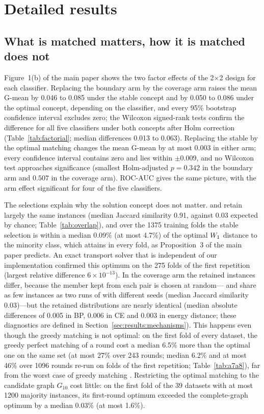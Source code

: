 \section{Detailed results}\label{sec:results}

\subsection{What is matched matters, how it is matched does not}\label{sec:results:factorial}

Figure~1(b) of the main paper shows the two factor effects of the 2$\times$2 design for each classifier. Replacing the boundary arm by the coverage arm raises the mean G-mean by 0.046 to 0.085 under the stable concept and by 0.050 to 0.086 under the optimal concept, depending on the classifier, and every 95\% bootstrap confidence interval excludes zero; the Wilcoxon signed-rank tests confirm the difference for all five classifiers under both concepts after Holm correction (Table~\ref{tab:factorial}; median differences 0.013 to 0.063). Replacing the stable by the optimal matching changes the mean G-mean by at most 0.003 in either arm; every confidence interval contains zero and lies within $\pm0.009$, and no Wilcoxon test approaches significance (smallest Holm-adjusted $p=0.342$ in the boundary arm and $0.507$ in the coverage arm). ROC-AUC gives the same picture, with the arm effect significant for four of the five classifiers.

The selections explain why the solution concept does not matter. \MUSBS{} and \MUSBO{} retain largely the same instances (median Jaccard similarity 0.91, against 0.03 expected by chance; Table~\ref{tab:overlap}), and over the 1375 training folds the stable selection is within a median 0.09\% (at most 4.7\%) of the optimal $W_1$ distance to the minority class, which \MUSBO{} attains in every fold, as Proposition~3 of the main paper predicts. An exact transport solver that is independent of our implementation confirmed this optimum on the 275 folds of the first repetition (largest relative difference $6\times10^{-13}$). In the coverage arm the retained instances differ, because the member kept from each pair is chosen at random---\MUSCS{} and \MUSCO{} share as few instances as two runs of \MUSCS{} with different seeds (median Jaccard similarity 0.03)---but the retained distributions are nearly identical (median absolute differences of 0.005 in BP, 0.006 in CE and 0.003 in energy distance; these diagnostics are defined in Section~\ref{sec:results:mechanisms}). This happens even though the greedy matching is not optimal: on the first fold of every dataset, the greedy perfect matching of a round cost a median 6.5\% more than the optimal one on the same set (at most 27\% over 243 rounds; median 6.2\% and at most 46\% over 1096 rounds re-run on folds of the first repetition; Table~\ref{tab:a7a8}), far from the worst case of greedy matching \citep{reingold1981greedy}. Restricting the optimal matching to the candidate graph $G_{10}$ cost little: on the first fold of the 39 datasets with at most 1200 majority instances, its first-round optimum exceeded the complete-graph optimum by a median 0.03\% (at most 1.6\%).

